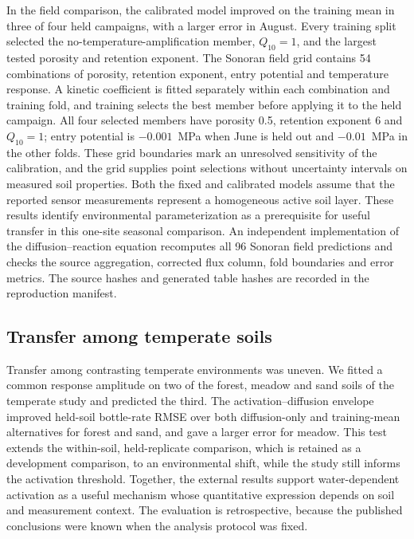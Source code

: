 \documentclass[11pt,a4paper]{article}
\begin{document}
In the field comparison, the calibrated model improved on the training mean in three of four held campaigns, with a larger error in August. Every training split selected the no-temperature-amplification member, $Q_{10}=1$, and the largest tested porosity and retention exponent. The Sonoran field grid contains 54 combinations of porosity, retention exponent, entry potential and temperature response. A kinetic coefficient is fitted separately within each combination and training fold, and training selects the best member before applying it to the held campaign. All four selected members have porosity 0.5, retention exponent 6 and $Q_{10}=1$; entry potential is $-0.001$~MPa when June is held out and $-0.01$~MPa in the other folds. These grid boundaries mark an unresolved sensitivity of the calibration, and the grid supplies point selections without uncertainty intervals on measured soil properties. Both the fixed and calibrated models assume that the reported sensor measurements represent a homogeneous active soil layer. These results identify environmental parameterization as a prerequisite for useful transfer in this one-site seasonal comparison. An independent implementation of the diffusion--reaction equation recomputes all 96 Sonoran field predictions and checks the source aggregation, corrected flux column, fold boundaries and error metrics. The source hashes and generated table hashes are recorded in the reproduction manifest.

\subsection{Transfer among temperate soils}
Transfer among contrasting temperate environments was uneven. We fitted a common response amplitude on two of the forest, meadow and sand soils of the temperate study and predicted the third. The activation--diffusion envelope improved held-soil bottle-rate RMSE over both diffusion-only and training-mean alternatives for forest and sand, and gave a larger error for meadow. This test extends the within-soil, held-replicate comparison, which is retained as a development comparison, to an environmental shift, while the study still informs the activation threshold. Together, the external results support water-dependent activation as a useful mechanism whose quantitative expression depends on soil and measurement context. The evaluation is retrospective, because the published conclusions were known when the analysis protocol was fixed.
\end{document}
